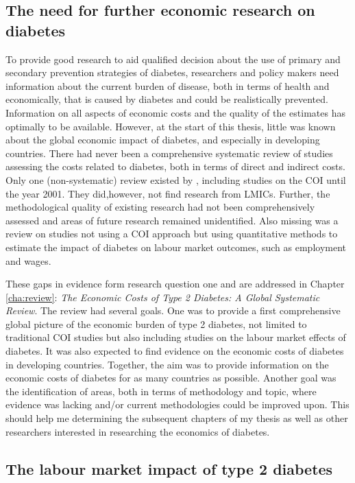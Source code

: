 \subsection{The need for further economic research on diabetes}

To provide good research to aid qualified decision about the use of primary and secondary prevention strategies of diabetes, researchers and policy makers need information about the current burden of disease, both in terms of health and economically, that is caused by diabetes and could be realistically prevented. Information on all aspects of economic costs and the quality of the estimates has optimally to be available. However, at the start of this thesis, little was known about the global economic impact of diabetes, and especially in developing countries. There had never been a comprehensive systematic review of studies assessing the costs related to diabetes, both in terms of direct and indirect costs. Only one (non-systematic) review existed by \textcite{Ettaro2004}, including studies on the \ac{COI} until the year 2001. They did,however, not find research from \acp{LMIC}. Further, the methodological quality of existing research had not been comprehensively assessed and areas of future research remained unidentified. Also missing was a review on studies not using a \ac{COI} approach but using quantitative methods to estimate the impact of diabetes on labour market outcomes, such as employment and wages.

These gaps in evidence form research question one and are addressed in Chapter \ref{cha:review}: \textit{The Economic Costs of Type 2 Diabetes: A Global Systematic Review}. The review had several goals. One was to provide a first comprehensive global picture of the economic burden of type 2 diabetes, not limited to traditional \ac{COI} studies but also including studies on the labour market effects of diabetes. It was also expected to find evidence on the economic costs of diabetes in developing countries. Together, the aim was to provide information on the economic costs of diabetes for as many countries as possible. Another goal was the identification of areas, both in terms of methodology and topic, where evidence was lacking and/or current methodologies could be improved upon. This should help me determining the subsequent chapters of my thesis as well as other researchers interested in researching the economics of diabetes.

\subsection{The labour market impact of type 2 diabetes}

